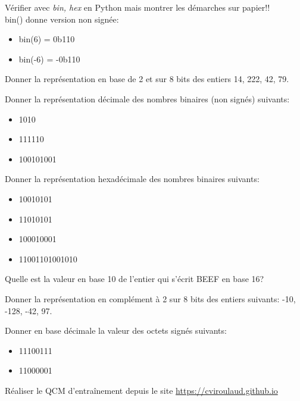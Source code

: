 \documentclass[a4paper,11pt]{article}
\begin{document}
\begin{Form}
\begin{commentprof}
Vérifier avec \emph{bin, hex} en Python mais montrer les démarches sur papier!!\\
bin() donne version non signée:
\begin{itemize}
\item bin(6) = 0b110
\item bin(-6) = -0b110
\end{itemize}
\end{commentprof}
\begin{exo}
Donner la représentation en base de 2 et sur 8 bits des entiers 14, 222, 42, 79.
\end{exo}
\begin{exo}
Donner la représentation décimale des nombres binaires (non signés) suivants:
\begin{itemize}
\item 1010
\item 111110
\item 100101001
\end{itemize}
\end{exo}
\begin{exo}
Donner la représentation hexadécimale des nombres binaires suivants:
\begin{itemize}
\item 10010101
\item 11010101
\item 100010001
\item 11001101001010
\end{itemize}
\end{exo}
\begin{exo}
Quelle est la valeur en base 10 de l'entier qui s'écrit BEEF en base 16?
\end{exo}
\begin{exo}
Donner la représentation en complément à 2 sur 8 bits des entiers suivants: -10, -128, -42, 97.
\end{exo}
\begin{exo}
Donner en base décimale la valeur des octets signés suivants:
\begin{itemize}
\item 11100111
\item 11000001
\end{itemize}
\end{exo}
\begin{exo}
Réaliser le QCM d’entraînement depuis le site \url{https://cviroulaud.github.io} 
\end{exo}

\end{Form}
\end{document}
